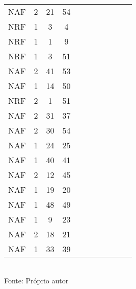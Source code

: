 \begin{table}[H]
{\begin{tabular}{ccccccccccc}
NAF & 2 & 21 & 54 &  &  &  &  &  &  &  \\
NRF & 1 & 3 & 4 &  &  &  &  &  &  &  \\
NRF & 1 & 1 & 9 &  &  &  &  &  &  &  \\
NRF & 1 & 3 & 51 &  &  &  &  &  &  &  \\
NAF & 2 & 41 & 53 &  &  &  &  &  &  &  \\
NAF & 1 & 14 & 50 &  &  &  &  &  &  &  \\
NRF & 2 & 1 & 51 &  &  &  &  &  &  &  \\
NAF & 2 & 31 & 37 &  &  &  &  &  &  &  \\
NAF & 2 & 30 & 54 &  &  &  &  &  &  &  \\
NAF & 1 & 24 & 25 &  &  &  &  &  &  &  \\
NAF & 1 & 40 & 41 &  &  &  &  &  &  &  \\
NAF & 2 & 12 & 45 &  &  &  &  &  &  &  \\
NAF & 1 & 19 & 20 &  &  &  &  &  &  &  \\
NAF & 1 & 48 & 49 &  &  &  &  &  &  &  \\
NAF & 1 & 9 & 23 &  &  &  &  &  &  &  \\
NAF & 2 & 18 & 21 &  &  &  &  &  &  &  \\
NAF & 1 & 33 & 39 &  &  &  &  &  &  &  \\
\bottomrule
\end{tabular}}
\\Fonte: Próprio autor
\end{table}


